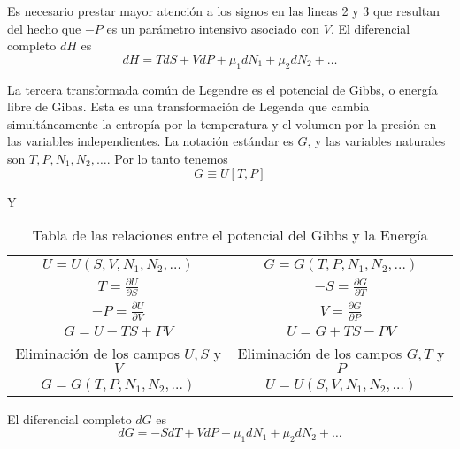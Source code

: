 \documentclass{report}
\begin{document}
Es necesario prestar mayor atención a los signos en las lineas 2 y 3 que resultan del hecho que $-P$ es un parámetro intensivo asociado con $V$. El diferencial completo $dH$ es
\begin{equation}
  \label{5.47}
  dH = T dS + V dP + \mu_1 dN_1 + \mu_2 dN_2 + \ldots
\end{equation}

La tercera transformada común de Legendre es el potencial de Gibbs, o energía libre de Gibas. Esta es una transformación de Legenda que cambia simultáneamente la entropía por la temperatura y el volumen por la presión en las variables independientes. La notación estándar es $G$, y las variables naturales son $T,P,N_1,N_2,\ldots$. Por lo tanto tenemos
\begin{equation}
  \label{eq:5.48}
  G\equiv U\left[ T,P \right] 
\end{equation}

Y

\begin{table}[h]
  \centering
  \label{table:Gibbs}
  \caption{Tabla de las relaciones entre el potencial del Gibbs y la Energía}
  \begin{tabular}{c|c}
    \hline
    $U=U(S,V,N_1,N_2,\ldots)$ & $G=G(T,P,N_1,N_2,\ldots)$ \\
    $T=\frac{\partial U}{\partial S}$ & $-S=\frac{\partial G}{\partial T}$ \\
    $-P=\frac{\partial U}{\partial V}$ & $V=\frac{\partial G}{\partial P}$ \\
    $G=U-TS+PV$ & $U=G+TS-PV$ \\
    Eliminación de los campos $U,S$ y $V$ & Eliminación de los campos $G,T$ y $P$ \\
    $G=G(T,P,N_1,N_2,\ldots)$ & $U=U(S,V,N_1,N_2,\ldots)$\\
    \hline
  \end{tabular}
\end{table}

El diferencial completo $dG$ es
\begin{equation}
  \label{eq:5.53}
  dG=-SdT+VdP+\mu_1dN_1+\mu_2dN_2+\ldots
\end{equation}
\end{document}
